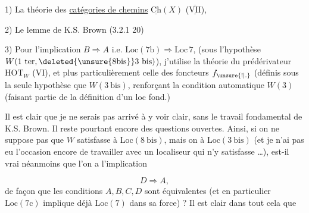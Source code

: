 
1) La théorie des \uline{catégories de chemins} $\underline{\mathrm{Ch}}(X)$ ($\underline{\overline{\mathrm{VII}}}$), 

2) Le lemme de K.S. Brown (3.2.1  20)

3) Pour l'implication $B\Rightarrow A$ i.e. $\mathrm{Loc}(7\mathrm b)\Rightarrow \mathrm{Loc}\,7$, (sous l'hypothèse $W(1\ \mathrm{ter},\deleted{\unsure{8\mathrm{bis}}}3\ \mathrm{bis})$), j'utilise la théorie du prédérivateur $\mathrm{HOT}_W$ (VI), et plus particulièrement celle des foncteurs $f_{\unsure{!|.}}$ (définis sous la seule hypothèse que  $W(3\ \mathrm{bis})$, renforçant la condition automatique $W(3)$ (faisant partie de la définition d'un loc fond.)

Il est clair que je ne serais pas arrivé à y voir clair, sans le travail fondamental de K.S. Brown. Il reste pourtant encore des questions ouvertes. Ainsi, si on ne suppose pas que $W$ satisfasse à $\mathrm{Loc}(8\ \mathrm{bis})$, mais on  à $\mathrm{Loc}(3\ \mathrm{bis})$ (et je n'ai pas eu l'occasion encore de travailler avec un localiseur qui n'y satisfasse \ldots), est-il vrai néanmoins que l'on a  l'implication

\[
 D\Longrightarrow A,
\]
de façon que les conditions $A,B,C,D$ sont équivalentes (et en particulier $\mathrm{Loc}(7\mathrm c)$ implique déjà $\mathrm{Loc}(7)$ dans  sa force) ? Il est clair dans tout cela que

